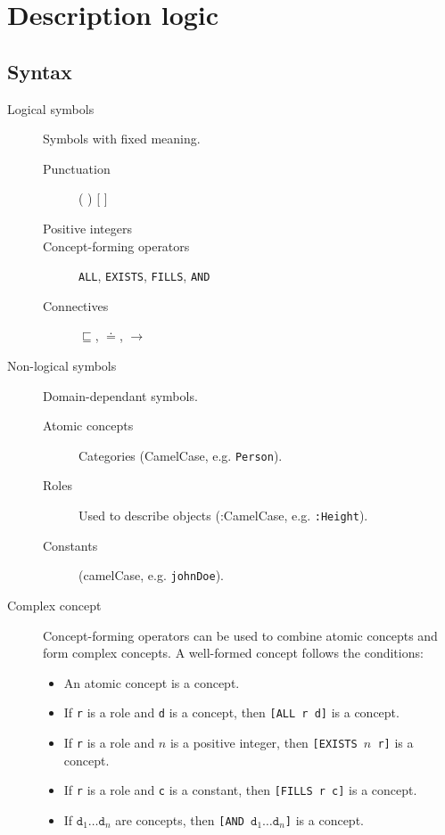 \chapter{Description logic}


\section{Syntax}

\begin{description}
    \item[Logical symbols] 
        Symbols with fixed meaning.
        \begin{description}
            \item[Punctuation] ( ) [ ]
            \item[Positive integers] 
            \item[Concept-forming operators] \texttt{ALL}, \texttt{EXISTS}, \texttt{FILLS}, \texttt{AND}
            \item[Connectives] $\sqsubseteq$, $\doteq$, $\rightarrow$
        \end{description}

    \item[Non-logical symbols] 
        Domain-dependant symbols.
        \begin{description}
            \item[Atomic concepts] Categories (CamelCase, e.g. \texttt{Person}).
            \item[Roles] Used to describe objects (:CamelCase, e.g. \texttt{:Height}).
            \item[Constants] (camelCase, e.g. \texttt{johnDoe}).
        \end{description}

    \item[Complex concept] 
        Concept-forming operators can be used to combine atomic concepts and form complex concepts.
        A well-formed concept follows the conditions:
        \begin{itemize}
            \item An atomic concept is a concept.
            \item If \texttt{r} is a role and \texttt{d} is a concept, then \texttt{[ALL r d]} is a concept.
            \item If \texttt{r} is a role and $n$ is a positive integer, then \texttt{[EXISTS $n$ r]} is a concept.
            \item If \texttt{r} is a role and \texttt{c} is a constant, then \texttt{[FILLS r c]} is a concept.
            \item If $\texttt{d}_1 \dots \texttt{d}_n$ are concepts, 
                then \texttt{[AND $\texttt{d}_1 \dots \texttt{d}_n$]} is a concept.
        \end{itemize}


\end{description}
